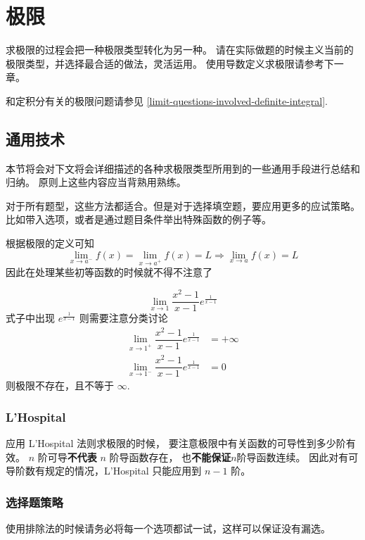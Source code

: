 \chapter{极限}

求极限的过程会把一种极限类型转化为另一种。
请在实际做题的时候主义当前的极限类型，并选择最合适的做法，灵活运用。
使用导数定义求极限请参考下一章。

和定积分有关的极限问题请参见 \ref{limit-questions-involved-definite-integral}.

\section{通用技术}

本节将会对下文将会详细描述的各种求极限类型所用到的一些通用手段进行总结和归纳。
原则上这些内容应当背熟用熟练。

对于所有题型，这些方法都适合。但是对于选择填空题，要应用更多的应试策略。
比如带入选项，或者是通过题目条件举出特殊函数的例子等。

根据极限的定义可知
\[
    \lim_{x \to a^-} f(x) = \lim_{x \to a^+} f(x) = L \Rightarrow \lim_{x\to a} f(x) = L
\]
因此在处理某些初等函数的时候就不得不注意了
\begin{example}
    \cite[page 9]{yc}
    \[
        \lim_{x \to 1} \dfrac{x^2 - 1}{x-1} e^{\frac{1}{x-1}}
    \]
    式子中出现 $e^{\frac{1}{x-1}}$ 则需要注意分类讨论
    \begin{align*}
        \lim_{x \to 1^+} \dfrac{x^2 - 1}{x-1} e^{\frac{1}{x-1}} &= +\infty\\
        \lim_{x \to 1^-} \dfrac{x^2 - 1}{x-1} e^{\frac{1}{x-1}} &= 0
    \end{align*}
    则极限不存在，且不等于 $\infty$.
\end{example} 

\subsection{L'Hospital}

应用 L'Hospital 法则求极限的时候，
要注意极限中有关函数的可导性到多少阶有效。
$n$ 阶可导\textbf{不代表} $n$ 阶导函数存在，
也\textbf{不能保证}$n$阶导函数连续。
因此对有可导阶数有规定的情况，L'Hospital 只能应用到 $n-1$ 阶。

\subsection{选择题策略}

使用排除法的时候请务必将每一个选项都试一试，这样可以保证没有漏选。

